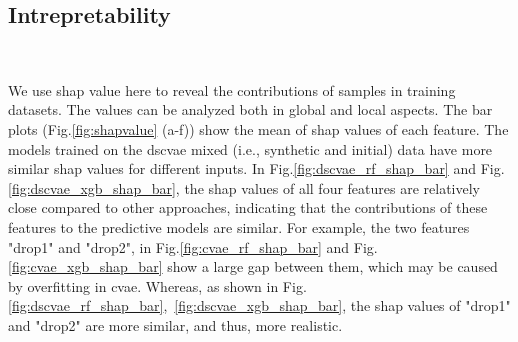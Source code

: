 \documentclass[twoside,twocolumn,9pt]{article}
\begin{document}
\subsection{Intrepretability}
\begin{figure*}[!htb]
    \centering
    \\
    \caption{SHAP values for Training Dataset}
    \label{fig:shapvalue}
\end{figure*}
We use \acrshort*{shap} value here to reveal the contributions of samples in training datasets. The values can be analyzed both in global and local aspects. 
The bar plots (Fig.\ref{fig:shapvalue} (a-f)) show the mean of \acrshort*{shap} values of each feature. The models trained on the \acrshort*{dscvae} mixed (i.e., synthetic and initial) data have more similar \acrshort*{shap} values for different inputs. In Fig.\ref{fig:dscvae_rf_shap_bar} and Fig.\ref{fig:dscvae_xgb_shap_bar}, the \acrshort*{shap} values of all four features are relatively close compared to other approaches, indicating that the contributions of these features to the predictive models are similar. For example, the two features "drop1" and "drop2", in
Fig.\ref{fig:cvae_rf_shap_bar} and Fig.\ref{fig:cvae_xgb_shap_bar} show a large gap between them, which may be caused by overfitting in \acrshort*{cvae}. Whereas, as shown in Fig.\ref{fig:dscvae_rf_shap_bar},~\ref{fig:dscvae_xgb_shap_bar}, the \acrshort*{shap} values of "drop1" and "drop2" are more similar, and thus, more realistic. 
\end{document}
